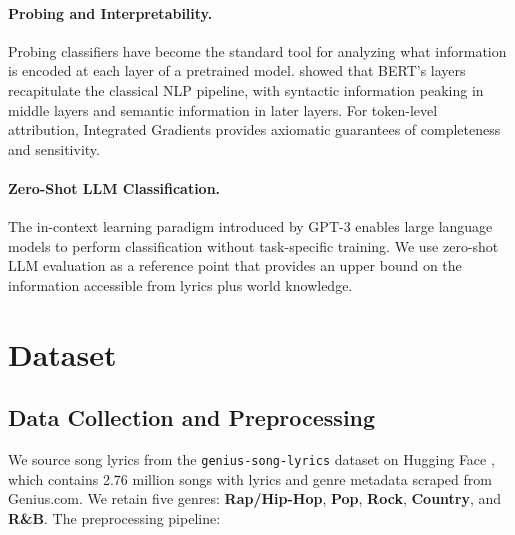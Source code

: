 \documentclass[11pt,a4paper]{article}
\begin{document}
\paragraph{Probing and Interpretability.}
Probing classifiers \citep{conneau2018probing} have become the standard
tool for analyzing what information is encoded at each layer of a
pretrained model.
\citet{tenney2019bert} showed that BERT's layers recapitulate the
classical NLP pipeline, with syntactic information peaking in middle
layers and semantic information in later layers.
For token-level attribution, Integrated Gradients
\citep{sundararajan2017axiomatic} provides axiomatic guarantees of
completeness and sensitivity.

\paragraph{Zero-Shot LLM Classification.}
The in-context learning paradigm introduced by GPT-3
\citep{brown2020language} enables large language models to perform
classification without task-specific training.
We use zero-shot LLM evaluation as a reference point that provides an
upper bound on the information accessible from lyrics plus world
knowledge.


\section{Dataset}
\label{sec:data}

\subsection{Data Collection and Preprocessing}

We source song lyrics from the \texttt{genius-song-lyrics} dataset on
Hugging Face \citep{genius_dataset}, which contains 2.76 million songs
with lyrics and genre metadata scraped from Genius.com.
We retain five genres: \textbf{Rap/Hip-Hop}, \textbf{Pop},
\textbf{Rock}, \textbf{Country}, and \textbf{R\&B}.
The preprocessing pipeline:
\end{document}
